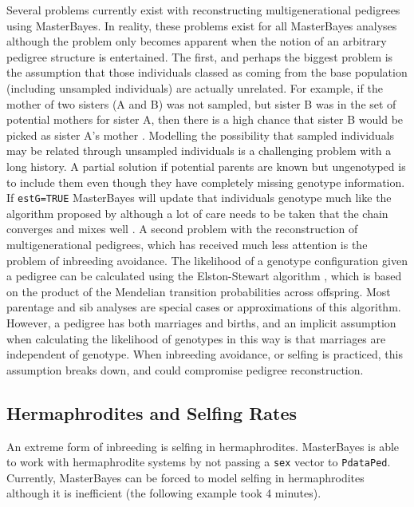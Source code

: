 \documentclass{article}
\begin{document}
Several problems currently exist with reconstructing multigenerational pedigrees using MasterBayes.  In reality, these problems exist for all MasterBayes analyses although the problem only becomes apparent when the notion of an arbitrary pedigree structure is entertained.  The first, and perhaps the biggest problem is the assumption that those individuals classed as coming from the base population (including unsampled individuals) are actually unrelated.  For example, if the mother of two sisters (A and B) was not sampled, but sister B was in the set of potential mothers for sister A, then there is a high chance that sister B would be picked as sister A's mother \citep{Thompson.1976a}.  Modelling the possibility that sampled individuals may be related through unsampled individuals is a challenging problem with a long history.  A partial solution if potential parents are known but ungenotyped is to include them even though they have completely missing genotype information. If \texttt{estG=TRUE} MasterBayes will update that individuals genotype much like the algorithm proposed by \citet{Emery.2001} although a lot of care needs to be taken that the chain converges and mixes well .  A second problem with the reconstruction of multigenerational pedigrees, which has received much less attention is the problem of inbreeding avoidance.  The likelihood of a genotype configuration given a pedigree can be calculated using the Elston-Stewart algorithm \citep{Elston.1971}, which is based on the product of the Mendelian transition probabilities across offspring.  Most parentage and sib analyses are special cases or approximations of this algorithm.  However, a pedigree has both marriages and births, and an implicit assumption when calculating the likelihood of genotypes in this way is that marriages are independent of genotype. When inbreeding avoidance, or selfing is practiced, this assumption breaks down, and could compromise pedigree reconstruction. 

\subsection{Hermaphrodites and Selfing Rates}
\label{Herm-sec}

An extreme form of inbreeding is selfing in hermaphrodites.  MasterBayes is able to work with hermaphrodite systems by not passing a \texttt{sex} vector to \texttt{PdataPed}.  Currently, MasterBayes can be forced to model selfing in hermaphrodites although it is inefficient (the following example took 4 minutes).  
\end{document}
